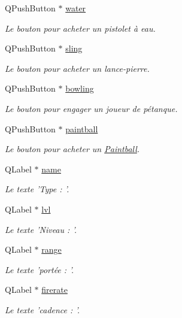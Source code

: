 \begin{DoxyCompactItemize}
QPushButton $\ast$ \hyperlink{classUI_aaa5e1351929c7da7d4ae82ddbc31c77b}{water}
\begin{DoxyCompactList}\small\item\em Le bouton pour acheter un pistolet à eau. \end{DoxyCompactList}\item 
QPushButton $\ast$ \hyperlink{classUI_af645e28743002610e25ce8542dcb1a8e}{sling}
\begin{DoxyCompactList}\small\item\em Le bouton pour acheter un lance-\/pierre. \end{DoxyCompactList}\item 
QPushButton $\ast$ \hyperlink{classUI_a8279bd03cdee4ab01f04152f2ea7a906}{bowling}
\begin{DoxyCompactList}\small\item\em Le bouton pour engager un joueur de pétanque. \end{DoxyCompactList}\item 
QPushButton $\ast$ \hyperlink{classUI_a39fd06f53449fb6382de26d280be2e5f}{paintball}
\begin{DoxyCompactList}\small\item\em Le bouton pour acheter un \hyperlink{classPaintball}{Paintball}. \end{DoxyCompactList}\item 
QLabel $\ast$ \hyperlink{classUI_a81ae571ef0c2c3044c1a5271887f5936}{name}
\begin{DoxyCompactList}\small\item\em Le texte 'Type : '. \end{DoxyCompactList}\item 
QLabel $\ast$ \hyperlink{classUI_a92e0870069d6ca6cd8b6dba91ec3702d}{lvl}
\begin{DoxyCompactList}\small\item\em Le texte 'Niveau : '. \end{DoxyCompactList}\item 
QLabel $\ast$ \hyperlink{classUI_aacb7c02b6a962b8adc8a7d4b6ffc1553}{range}
\begin{DoxyCompactList}\small\item\em Le texte 'portée : '. \end{DoxyCompactList}\item 
QLabel $\ast$ \hyperlink{classUI_a58bde2e8f6ca9d8f2fa32affefa02045}{firerate}
\begin{DoxyCompactList}\small\item\em Le texte 'cadence : '. \end{DoxyCompactList}\item 

\end{DoxyCompactItemize}
